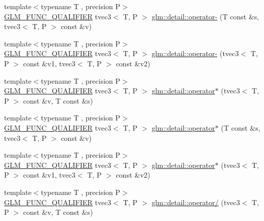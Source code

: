 \begin{DoxyCompactItemize}
\item 
{\footnotesize template$<$typename T , precision P$>$ }\\\hyperlink{setup_8hpp_a33fdea6f91c5f834105f7415e2a64407}{G\+L\+M\+\_\+\+F\+U\+N\+C\+\_\+\+Q\+U\+A\+L\+I\+F\+I\+ER} tvec3$<$ T, P $>$ \hyperlink{namespaceglm_1_1detail_afb0330c035d662dc0d3ab656c6756fb9}{glm\+::detail\+::operator-\/} (T const \&s, tvec3$<$ T, P $>$ const \&v)
\item 
{\footnotesize template$<$typename T , precision P$>$ }\\\hyperlink{setup_8hpp_a33fdea6f91c5f834105f7415e2a64407}{G\+L\+M\+\_\+\+F\+U\+N\+C\+\_\+\+Q\+U\+A\+L\+I\+F\+I\+ER} tvec3$<$ T, P $>$ \hyperlink{namespaceglm_1_1detail_a492c03316418179ad7809e52c8d2a905}{glm\+::detail\+::operator-\/} (tvec3$<$ T, P $>$ const \&v1, tvec3$<$ T, P $>$ const \&v2)
\item 
{\footnotesize template$<$typename T , precision P$>$ }\\\hyperlink{setup_8hpp_a33fdea6f91c5f834105f7415e2a64407}{G\+L\+M\+\_\+\+F\+U\+N\+C\+\_\+\+Q\+U\+A\+L\+I\+F\+I\+ER} tvec3$<$ T, P $>$ \hyperlink{namespaceglm_1_1detail_a2bdad3607a0d35338cc7e10316ecc2b2}{glm\+::detail\+::operator$\ast$} (tvec3$<$ T, P $>$ const \&v, T const \&s)
\item 
{\footnotesize template$<$typename T , precision P$>$ }\\\hyperlink{setup_8hpp_a33fdea6f91c5f834105f7415e2a64407}{G\+L\+M\+\_\+\+F\+U\+N\+C\+\_\+\+Q\+U\+A\+L\+I\+F\+I\+ER} tvec3$<$ T, P $>$ \hyperlink{namespaceglm_1_1detail_a5b4c21ed4f8d640fdb942e6cec2e6989}{glm\+::detail\+::operator$\ast$} (T const \&s, tvec3$<$ T, P $>$ const \&v)
\item 
{\footnotesize template$<$typename T , precision P$>$ }\\\hyperlink{setup_8hpp_a33fdea6f91c5f834105f7415e2a64407}{G\+L\+M\+\_\+\+F\+U\+N\+C\+\_\+\+Q\+U\+A\+L\+I\+F\+I\+ER} tvec3$<$ T, P $>$ \hyperlink{namespaceglm_1_1detail_acc70f82dcc18797a9f608c6f58d88514}{glm\+::detail\+::operator$\ast$} (tvec3$<$ T, P $>$ const \&v1, tvec3$<$ T, P $>$ const \&v2)
\item 
{\footnotesize template$<$typename T , precision P$>$ }\\\hyperlink{setup_8hpp_a33fdea6f91c5f834105f7415e2a64407}{G\+L\+M\+\_\+\+F\+U\+N\+C\+\_\+\+Q\+U\+A\+L\+I\+F\+I\+ER} tvec3$<$ T, P $>$ \hyperlink{namespaceglm_1_1detail_ae8948082c60e91786c515ca9363e9747}{glm\+::detail\+::operator/} (tvec3$<$ T, P $>$ const \&v, T const \&s)
\item 

\end{DoxyCompactItemize}
